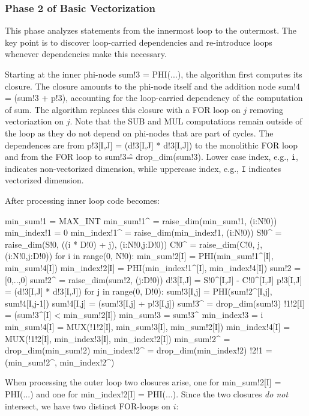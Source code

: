 \subsubsection{Phase 2 of Basic Vectorization}

This phase analyzes statements from the innermost loop to the outermost. The key point is to discover loop-carried dependencies and re-introduce loops whenever dependencies make this necessary.

Starting at the inner phi-node {\sf sum!3 = PHI(...)}, the algorithm first computes its closure. The closure amounts to the phi-node itself and the addition node {\sf sum!4 = (sum!3 + p!3)}, accounting for the loop-carried dependency of the computation of {\sf sum}. The algorithm replaces this closure with a FOR loop on $j$ removing vectoriaztion on $j$. Note that the SUB and MUL computations remain outside of the loop as they do not depend on phi-nodes that are part of cycles. The dependences are from {\sf p!3[I,J] = (d!3[I,J] * d!3[I,J])} to the monolithic FOR loop and from the FOR loop to {\sf sum!3\^ = drop\_dim(sum!3)}. Lower case index, e.g., \texttt{i}, indicates non-vectorized dimension, while uppercase index, e.g., \texttt{I} indicates vectorized dimension.

After processing inner loop code becomes:

{\small
\begin{pythonn}
min_sum!1 = MAX_INT
min_sum!1^ = raise_dim(min_sum!1, (i:N!0))
min_index!1 = 0
min_index!1^ = raise_dim(min_index!1, (i:N!0))
S!0^ = raise_dim(S!0, ((i * D!0) + j), (i:N!0,j:D!0))
C!0^ = raise_dim(C!0, j, (i:N!0,j:D!0))
for i in range(0, N!0):
  min_sum!2[I] = PHI(min_sum!1^[I], min_sum!4[I]) 
  min_index!2[I] = PHI(min_index!1^[I], min_index!4[I])  
  sum!2 = [0,..,0] 
  sum!2^ = raise_dim(sum!2, (j:D!0))
  d!3[I,J] = S!0^[I,J] - C!0^[I,J]
  p!3[I,J] = (d!3[I,J] * d!3[I,J])
  for j in range(0, D!0):
    sum!3[I,j] = PHI(sum!2^[I,j], sum!4[I,j-1])       
    sum!4[I,j] = (sum!3[I,j] + p!3[I,j])
  sum!3^ = drop_dim(sum!3)     
  !1!2[I] = (sum!3^[I] < min_sum!2[I])
  min_sum!3 = sum!3^
  min_index!3 = i
  min_sum!4[I] = MUX(!1!2[I], min_sum!3[I], min_sum!2[I])
   min_index!4[I] = MUX(!1!2[I], min_index!3[I], min_index!2[I])
min_sum!2^ = drop_dim(min_sum!2)
min_index!2^ = drop_dim(min_index!2)   
!2!1 = (min_sum!2^, min_index!2^)
\end{pythonn}
}

When processing the outer loop two closures arise, one for {\sf min\_sum!2[I] = PHI(...)} and one 
for {\sf min\_index!2[I] = PHI(...)}. Since the two closures \emph{do not} intersect, we have two distinct FOR-loops on $i$:

